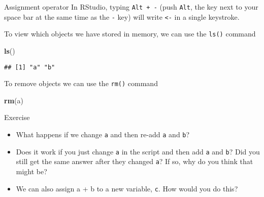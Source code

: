 \documentclass[
  11pt,
  ignorenonframetext,
]{beamer}
\newenvironment{Shaded}{\begin{snugshade}}{\end{snugshade}}
\newcommand{\KeywordTok}[1]{\textcolor[rgb]{0.13,0.29,0.53}{\textbf{#1}}}
\newcommand{\NormalTok}[1]{#1}
\providecommand{\tightlist}{%
  \setlength{\itemsep}{0pt}\setlength{\parskip}{0pt}}
\begin{document}
\begin{frame}[fragile]{Assignment operator}
In RStudio, typing \texttt{Alt\ +\ -} (push \texttt{Alt}, the key next
to your space bar at the same time as the \texttt{-} key) will write
\texttt{\textless{}-} in a single keystroke.

To view which objects we have stored in memory, we can use the
\texttt{ls()} command

\begin{Shaded}
\begin{Highlighting}[]
\KeywordTok{ls}\NormalTok{()}
\end{Highlighting}
\end{Shaded}

\begin{verbatim}
## [1] "a" "b"
\end{verbatim}

To remove objects we can use the \texttt{rm()} command

\begin{Shaded}
\begin{Highlighting}[]
\KeywordTok{rm}\NormalTok{(a)}
\end{Highlighting}
\end{Shaded}

\begin{block}{Exercise}

\begin{itemize}
\tightlist
\item
  What happens if we change \texttt{a} and then re-add \texttt{a} and
  \texttt{b}?
\item
  Does it work if you just change \texttt{a} in the script and then add
  \texttt{a} and \texttt{b}? Did you still get the same answer after
  they changed \texttt{a}? If so, why do you think that might be?
\item
  We can also assign a + b to a new variable, \texttt{c}. How would you
  do this?
\end{itemize}

\end{block}

\end{frame}
\end{document}
